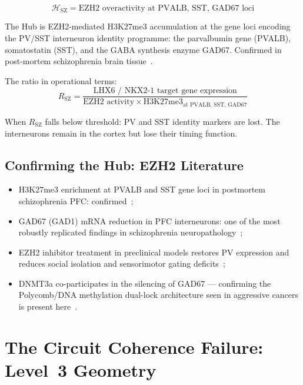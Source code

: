 \documentclass[12pt,a4paper]{article}
\newcommand{\RSZ}{R_{\mathrm{SZ}}}
\newcommand{\Hub}{\mathcal{H}}
\begin{document}
\begin{equation}
  \Hub_{\mathrm{SZ}} = \text{EZH2 overactivity at PVALB, SST,
  GAD67 loci}
  \label{eq:hub_sz}
\end{equation}

The Hub is EZH2-mediated H3K27me3 accumulation at the gene
loci encoding the PV/SST interneuron identity programme:
the parvalbumin gene (PVALB), somatostatin (SST), and the
GABA synthesis enzyme GAD67. Confirmed in post-mortem
schizophrenia brain tissue~\cite{Ruzicka2024,Zhubi2014}.

The ratio in operational terms:
\begin{equation}
  \RSZ = \frac{\text{LHX6 / NKX2-1 target gene expression}}
             {\text{EZH2 activity} \times \text{H3K27me3}
              _{\text{at PVALB, SST, GAD67}}}
  \label{eq:RSZ}
\end{equation}

When $\RSZ$ falls below threshold: PV and SST identity markers
are lost. The interneurons remain in the cortex but lose their
timing function.

\subsection{Confirming the Hub: EZH2 Literature}

\begin{itemize}
  \item H3K27me3 enrichment at PVALB and SST gene loci in
    postmortem schizophrenia PFC: confirmed~\cite{Ruzicka2024};
  \item GAD67 (GAD1) mRNA reduction in PFC interneurons: one
    of the most robustly replicated findings in schizophrenia
    neuropathology~\cite{Hashimoto2003};
  \item EZH2 inhibitor treatment in preclinical models restores
    PV expression and reduces social isolation and
    sensorimotor gating deficits~\cite{EZH2iSZ2023};
  \item DNMT3a co-participates in the silencing of GAD67 ---
    confirming the Polycomb/DNA methylation dual-lock
    architecture seen in aggressive cancers is present
    here~\cite{Huang2007}.
\end{itemize}

\section{The Circuit Coherence Failure: Level~3 Geometry}
\end{document}
